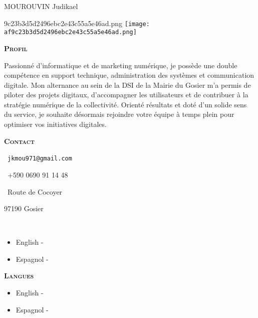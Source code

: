 \documentclass[11pt,a4paper]{article}
\newcommand{\headleft}[1]{\vspace*{3ex}\textsc{\textbf{#1}}\par%
  \vspace*{-1.5ex}\hrulefill\par\vspace*{0.7ex}}
\begin{document}
\thispagestyle{empty}
\setlength{\topskip}{0pt}\setlength{\parindent}{0pt}\setlength{\parskip}{0pt}
\raggedbottom

\begin{minipage}[t]{0.33\textwidth}
  \colorbox{cvblue}{\begin{minipage}[t][5mm][t]{\textwidth}\null\end{minipage}}
  \vspace{-.2ex}
  \colorbox{cvblue!90}{%
    \color{white}\textwidth
    \begin{minipage}[t][293mm][t]{0.82\textwidth}\raggedright
      \vspace*{2.5ex}
      \Large MOUROUVIN Judikael\normalsize

      \ifx\relaxaf9c23b3d5d2496ebc2e43c55a5e46ad.png\relax\else
        \vspace{2ex}\null\hfill
        \texttt{[image: af9c23b3d5d2496ebc2e43c55a5e46ad.png]}
        \hfill\null
      \fi

      \headleft{Profil}
      \begingroup           %
        Passionné d’informatique et de marketing numérique, je possède une double compétence en support technique, administration des systèmes et communication digitale. Mon alternance au sein de la DSI de la Mairie du Gosier m’a permis de piloter des projets digitaux, d’accompagner les utilisateurs et de contribuer à la stratégie numérique de la collectivité. Orienté résultats et doté d’un solide sens du service, je souhaite désormais rejoindre votre équipe à temps plein pour optimiser vos initiatives digitales.
      \endgroup             %

      \headleft{Contact}\small
      \MVAt\  \texttt{jkmou971@gmail.com}\par
      \Mobilefone\ +590 0690 91 14 48\par
      \Letter\ Route de Cocoyer\par
      97190 Gosier\par
      \faLinkedin\  \href{}{}
      \normalsize

      \ifx\relax\begin{itemize}[leftmargin=*]
\item English - \textcolor{gray}{}
\item Espagnol - \textcolor{gray}{}\end{itemize}\relax\else
        \headleft{Langues}
        \begin{itemize}[leftmargin=*]
\item English - \textcolor{gray}{}
\item Espagnol - \textcolor{gray}{}\end{itemize}
      \fi


\end{minipage}}
\end{minipage}
\end{document}
